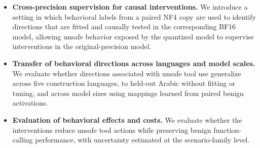 \begin{itemize}[nosep,leftmargin=*]
\item \textbf{Cross-precision supervision for causal interventions.} We introduce a setting in which behavioral labels from a paired NF4 copy are used to identify directions that are fitted and causally tested in the corresponding BF16 model, allowing unsafe behavior exposed by the quantized model to supervise interventions in the original-precision model.

\item \textbf{Transfer of behavioral directions across languages and model scales.} We evaluate whether directions associated with unsafe tool use generalize across five construction languages, to held-out Arabic without fitting or tuning, and across model sizes using mappings learned from paired benign activations.

\item \textbf{Evaluation of behavioral effects and costs.} We evaluate whether the interventions reduce unsafe tool actions while preserving benign function-calling performance, with uncertainty estimated at the scenario-family level. 
\end{itemize}